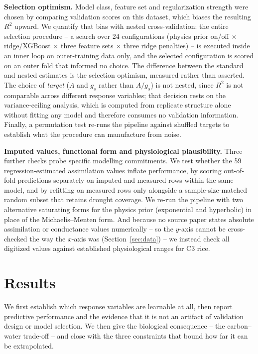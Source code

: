 \documentclass[runningheads]{llncs}
\begin{document}
\textbf{Selection optimism.} Model class, feature set and regularization strength were chosen by comparing validation scores on this dataset, which biases the resulting $R^{2}$ upward. We quantify that bias with nested cross-validation: the entire selection procedure -- a search over 24 configurations (physics prior on/off $\times$ ridge/XGBoost $\times$ three feature sets $\times$ three ridge penalties) -- is executed inside an inner loop on outer-training data only, and the selected configuration is scored on an outer fold that informed no choice. The difference between the standard and nested estimates is the selection optimism, measured rather than asserted. The choice of \emph{target} ($A$ and $g_s$ rather than $A/g_s$) is not nested, since $R^{2}$ is not comparable across different response variables; that decision rests on the variance-ceiling analysis, which is computed from replicate structure alone without fitting any model and therefore consumes no validation information. Finally, a permutation test re-runs the pipeline against shuffled targets to establish what the procedure can manufacture from noise.

\textbf{Imputed values, functional form and physiological plausibility.} Three further checks probe specific modelling commitments. We test whether the 59 regression-estimated assimilation values inflate performance, by scoring out-of-fold predictions separately on imputed and measured rows within the same model, and by refitting on measured rows only alongside a sample-size-matched random subset that retains drought coverage. We re-run the pipeline with two alternative saturating forms for the physics prior (exponential and hyperbolic) in place of the Michaelis--Menten form. And because no source paper states absolute assimilation or conductance values numerically -- so the $y$-axis cannot be cross-checked the way the $x$-axis was (Section~\ref{sec:data}) -- we instead check all digitized values against established physiological ranges for C3 rice.

\section{Results}\label{sec:results}

We first establish which response variables are learnable at all, then report predictive performance and the evidence that it is not an artifact of validation design or model selection. We then give the biological consequence -- the carbon--water trade-off -- and close with the three constraints that bound how far it can be extrapolated.
\end{document}
